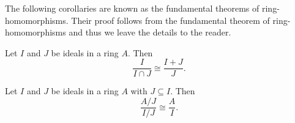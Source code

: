 \documentclass[11pt,a4paper]{article}
\begin{document}
The following corollaries are known as the fundamental theorems of ring-homomorphisms.
Their proof follows from the fundamental theorem of ring-homomorphisms and thus we leave the details to the reader.



\begin{cor}
    Let $I$ and $J$ be ideals in a ring $A$.
    Then \[\frac{I}{I\cap J} \cong \frac{I+J}{J}.\]
\end{cor}


\begin{cor}
    Let $I$ and $J$ be ideals in a ring $A$ with \(J\subseteq I\).
    Then \[\frac{A/J}{I / J} \cong \frac{A}{I}.\]
\end{cor}
\end{document}
